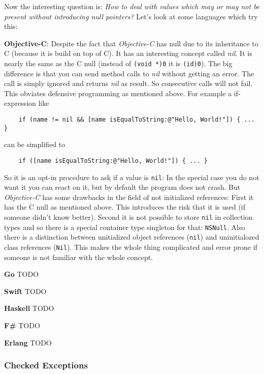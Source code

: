 \documentclass[a4paper,12pt]{article}
\begin{document}
Now the interesting question is: \textit{How to deal with values which may or may not be present without introducing null pointers?} Let's look at some languages which try this:

\textbf{Objective-C}: Despite the fact that \textit{Objective-C} has null due to its inheritance to C (because it is build on top of C). It has an interesting concept called \textit{nil}. It is nearly the same as the C null (instead of \verb|(void *)0| it is \verb|(id)0|). The big difference is that you can send method calls to \textit{nil} without getting an error. The call is simply ignored and returns \textit{nil} as result. So consecutive calls will not fail. This obviates defensive programming as mentioned above. For example a if-expression like

\begin{verbatim}
    if (name != nil && [name isEqualToString:@"Hello, World!"]) { ... }
\end{verbatim}

\noindent can be simplified to

\begin{verbatim}
    if ([name isEqualToString:@"Hello, World!"]) { ... }
\end{verbatim}

\noindent So it is an opt-in procedure to ask if a value is \verb|nil|: In the special case you do not want it you can react on it, but by default the program does not crash. But \textit{Objective-C} has some drawbacks in the field of not initialized references: First it has the C null as mentioned above. This introduces the risk that it is used (if someone didn't know better). Second it is not possible to store \verb|nil| in collection types and so there is a special container type singleton for that: \verb|NSNull|. Also there is a distinction between unitialized object references (\verb|nil|) and uninitialozed class references (\verb|Nil|). This makes the whole thing complicated and error prone if someone is not familiar with the whole concept.

\textbf{Go}
TODO

\textbf{Swift}
TODO

\textbf{Haskell}
TODO

\textbf{F\#}
TODO

\textbf{Erlang}
TODO

\subsubsection{Checked Exceptions}
\end{document}
